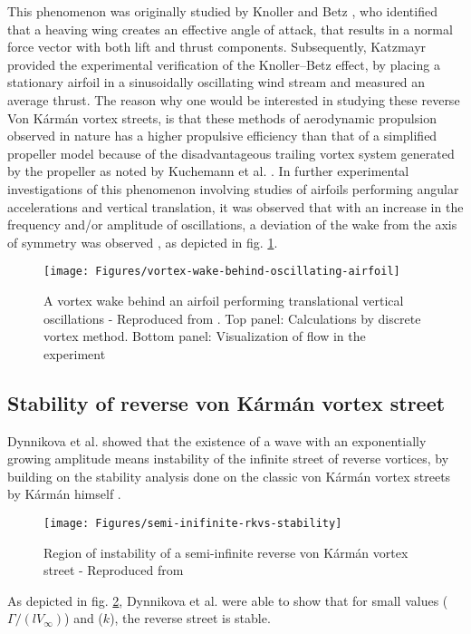 This phenomenon was originally studied by Knoller \parencite{knoller1909gesetzedes} and Betz \parencite{betz1912beitrag}, who identified that a heaving wing creates an effective angle of attack, that results in a normal force vector with both lift and thrust components. Subsequently, Katzmayr \parencite{katzmayr1922effect} provided the experimental verification of the Knoller–Betz effect, by placing a stationary airfoil in a sinusoidally oscillating wind stream and measured an average thrust.
The reason why one would be interested in studying these reverse  Von Kármán vortex streets, is that these methods of aerodynamic propulsion observed in nature has a higher propulsive efficiency than that of a simplified propeller model because of the disadvantageous trailing vortex system generated by the propeller as noted by Kuchemann et al. \parencite{kuchemann1953aerodynamic}.
In further experimental investigations of this phenomenon involving studies of airfoils performing angular accelerations and vertical translation, it was observed that with an increase in the frequency and/or amplitude of oscillations, a deviation of the wake from the axis of symmetry was observed \parencite{Jones1998}, as depicted in fig. \ref{fig:vortex-wake-behind-oscillating-airfoil}.
\begin{figure}[H]
	\centering
	\texttt{[image: Figures/vortex-wake-behind-oscillating-airfoil]}
	\caption{A vortex wake behind an airfoil performing translational vertical oscillations - Reproduced from \parencite{Jones1998}. Top panel: Calculations by discrete vortex method. Bottom panel: Visualization of flow in the experiment}
	\label{fig:vortex-wake-behind-oscillating-airfoil}
\end{figure}

\subsection{Stability of reverse von Kármán vortex street}
Dynnikova et al. \parencite{Dynnikova2021} showed that the existence of a wave with an exponentially growing amplitude means instability of the infinite street of reverse vortices, by building on the stability analysis done on the classic von Kármán vortex streets by Kármán himself \parencite{Karmán1912}.
\begin{figure}[H]
	\centering
	\texttt{[image: Figures/semi-inifinite-rkvs-stability]}
	\caption{Region of instability of a semi-infinite reverse von Kármán vortex street - Reproduced from \parencite{Dynnikova2021}}
	\label{fig:semi-inifinite-rkvs-stability}
\end{figure}
As depicted in fig. \ref{fig:semi-inifinite-rkvs-stability}, Dynnikova et al. were able to show that for small values ($\Gamma / (l V_{\infty})$) and ($k$), the reverse street is stable.

